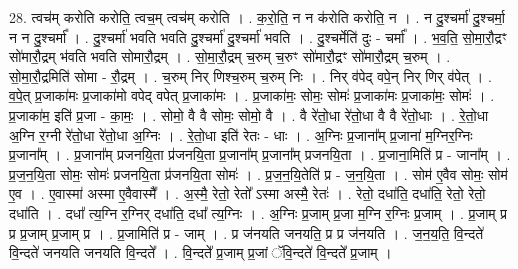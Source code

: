 \documentclass[17pt]{extarticle}
\begin{document}
28. त्वच॑म् करोति करोति॒ त्वच॒म् त्वच॑म् करोति । . क॒रो॒ति॒ न न क॑रोति करोति॒ न । . न दु॒श्चर्मा॑ दु॒श्चर्मा॒ न न दु॒श्चर्मा᳚ । . दु॒श्चर्मा॑ भवति भवति दु॒श्चर्मा॑ दु॒श्चर्मा॑ भवति । . दु॒श्चर्मेति॑ दुः - चर्मा᳚ । . भ॒व॒ति॒ सो॒मा॒रौ॒द्रꣳ सो॑मारौ॒द्रम् भ॑वति भवति सोमारौ॒द्रम् । . सो॒मा॒रौ॒द्रम् च॒रुम् च॒रुꣳ सो॑मारौ॒द्रꣳ सो॑मारौ॒द्रम् च॒रुम् । . सो॒मा॒रौ॒द्रमिति॑ सोमा - रौ॒द्रम् । . च॒रुम् निर् णिश्च॒रुम् च॒रुम् निः । . निर् व॑पेद् वपे॒न् निर् णिर् व॑पेत् । . व॒पे॒त् प्र॒जाका॑मः प्र॒जाका॑मो वपेद् वपेत् प्र॒जाका॑मः । . प्र॒जाका॑मः॒ सोमः॒ सोमः॑ प्र॒जाका॑मः प्र॒जाका॑मः॒ सोमः॑ । . प्र॒जाका॑म॒ इति॑ प्र॒जा - का॒मः॒ । . सोमो॒ वै वै सोमः॒ सोमो॒ वै । . वै रे॑तो॒धा रे॑तो॒धा वै वै रे॑तो॒धाः । . रे॒तो॒धा अ॒ग्नि र॒ग्नी रे॑तो॒धा रे॑तो॒धा अ॒ग्निः । . रे॒तो॒धा इति॑ रेतः - धाः । . अ॒ग्निः प्र॒जाना᳚म् प्र॒जाना॑ म॒ग्निर॒ग्निः प्र॒जाना᳚म् । . प्र॒जाना᳚म् प्रजनयि॒ता प्र॑जनयि॒ता प्र॒जाना᳚म् प्र॒जाना᳚म् प्रजनयि॒ता । . प्र॒जाना॒मिति॑ प्र - जाना᳚म् । . प्र॒ज॒न॒यि॒ता सोमः॒ सोमः॑ प्रजनयि॒ता प्र॑जनयि॒ता सोमः॑ । . प्र॒ज॒न॒यि॒तेति॑ प्र - ज॒न॒यि॒ता । . सोम॑ ए॒वैव सोमः॒ सोम॑ ए॒व । . ए॒वास्मा॑ अस्मा ए॒वैवास्मै᳚ । . अ॒स्मै॒ रेतो॒ रेतो᳚ ऽस्मा अस्मै॒ रेतः॑ । . रेतो॒ दधा॑ति॒ दधा॑ति॒ रेतो॒ रेतो॒ दधा॑ति । . दधा᳚ त्य॒ग्नि र॒ग्निर् दधा॑ति॒ दधा᳚ त्य॒ग्निः । . अ॒ग्निः प्र॒जाम् प्र॒जा म॒ग्नि र॒ग्निः प्र॒जाम् । . प्र॒जाम् प्र प्र प्र॒जाम् प्र॒जाम् प्र । . प्र॒जामिति॑ प्र - जाम् । . प्र ज॑नयति जनयति॒ प्र प्र ज॑नयति । . ज॒न॒य॒ति॒ वि॒न्दते॑ वि॒न्दते॑ जनयति जनयति वि॒न्दते᳚ । . वि॒न्दते᳚ प्र॒जाम् प्र॒जां ॅवि॒न्दते॑ वि॒न्दते᳚ प्र॒जाम् । \newline
\end{document}
